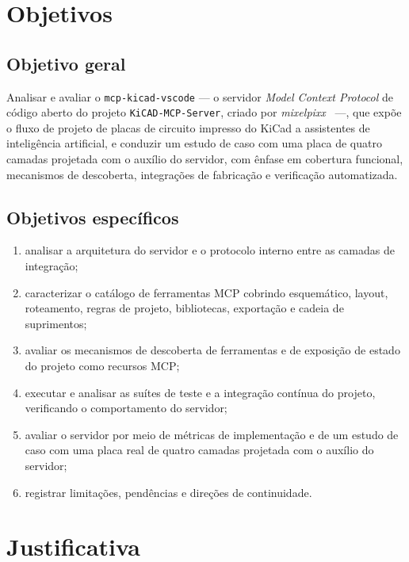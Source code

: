 \section{Objetivos}

\subsection{Objetivo geral}

Analisar e avaliar o \texttt{mcp-kicad-vscode} --- o servidor \emph{Model
Context Protocol} de código aberto do projeto \texttt{KiCAD-MCP-Server}, criado
por \emph{mixelpixx}~\citep{kicadmcpserver} ---, que expõe o fluxo de projeto
de placas de circuito impresso do KiCad a assistentes de inteligência
artificial, e conduzir um estudo de caso com uma placa de quatro camadas
projetada com o auxílio do servidor, com ênfase em cobertura funcional,
mecanismos de descoberta, integrações de fabricação e verificação automatizada.

\subsection{Objetivos específicos}

\begin{enumerate}[leftmargin=1.4em,itemsep=0.2em]
  \item analisar a arquitetura do servidor e o protocolo interno entre as
        camadas de integração;
  \item caracterizar o catálogo de ferramentas MCP cobrindo esquemático,
        layout, roteamento, regras de projeto, bibliotecas, exportação e
        cadeia de suprimentos;
  \item avaliar os mecanismos de descoberta de ferramentas e de exposição de
        estado do projeto como recursos MCP;
  \item executar e analisar as suítes de teste e a integração contínua do
        projeto, verificando o comportamento do servidor;
  \item avaliar o servidor por meio de métricas de implementação e de um
        estudo de caso com uma placa real de quatro camadas projetada com o
        auxílio do servidor;
  \item registrar limitações, pendências e direções de continuidade.
\end{enumerate}

\section{Justificativa}

